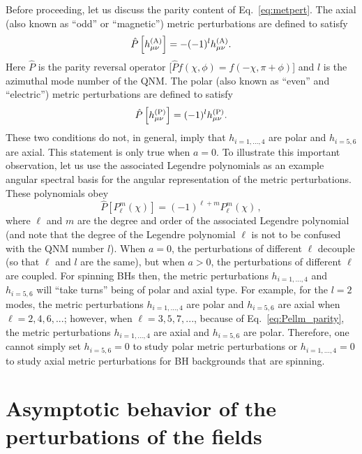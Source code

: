 \documentclass[aps,prx,amsmath,floats,floatfix,twocolumn,
  superscriptaddress,nofootinbib,showpacs]{revtex4-1}
\begin{document}
Before proceeding, let us discuss the parity content of Eq.~\eqref{eq:metpert}. 
The axial (also known as ``odd'' or ``magnetic'') metric perturbations are defined to satisfy \cite{Li:2023ulk, Nichols:2012jn}
\begin{equation}
\hat{P} \left[h^{\rm (A)}_{\mu \nu}\right] = -(-1)^{l} h^{\rm (A)}_{\mu \nu}. 
\end{equation}
Here $\hat{P} $ is the parity reversal operator [$\hat{P}f(\chi,\phi) = f(-\chi, \pi + \phi)$]
and $l$ is the azimuthal mode number of the QNM. 
The polar (also known as ``even'' and ``electric'') metric perturbations are defined to satisfy 
\begin{equation}
\hat{P} \left[h^{\rm (P)}_{\mu \nu}\right] = (-1)^{l} h^{\rm (P)}_{\mu \nu}. 
\end{equation}
These two conditions do not, in general, imply that $h_{i=1, ..., 4}$ are polar and $h_{i=5, 6}$ are axial. 
This statement is only true when $a=0$.
To illustrate this important observation, let us use the associated Legendre polynomials as an example angular spectral basis for the angular representation of the metric perturbations. These polynomials obey 
\begin{equation}\label{eq:Pellm_parity}
\hat{P} \left[P_{\ell}^{m}(\chi)\right] = (-1)^{\ell + m} P_{\ell}^{m}(\chi)\,,
\end{equation}
where $\ell$ and $m$ are the degree and order of the associated Legendre polynomial (and note that the degree of the Legendre polynomial $\ell$ is not to be confused with the QNM number $l$). 
When $a=0$, the perturbations of different $\ell$ decouple (so that $\ell$ and $l$ are the same), but when $a > 0 $, the perturbations of different $\ell$ are coupled. 
For spinning BHs then, the metric perturbations $h_{i=1, ..., 4}$ and $h_{i=5, 6}$ will ``take turns'' being of polar and axial type. 
For example, for the $l = 2$ modes, the metric perturbations $h_{i=1, ..., 4}$ are polar and $h_{i=5, 6}$ are axial when $\ell = 2, 4, 6, ... $; however, when $\ell = 3, 5, 7, ... $, because of Eq.~\eqref{eq:Pellm_parity}, the metric perturbations $h_{i=1, ..., 4}$ are axial and $h_{i=5, 6}$ are polar. Therefore, one cannot simply set $h_{i=5,6} = 0$ to study polar metric perturbations or $h_{i=1,\ldots,4}=0$ to study axial metric perturbations for BH backgrounds that are spinning.  

\section{Asymptotic behavior of the perturbations of the fields}
\label{sec:ansatz}
\end{document}
